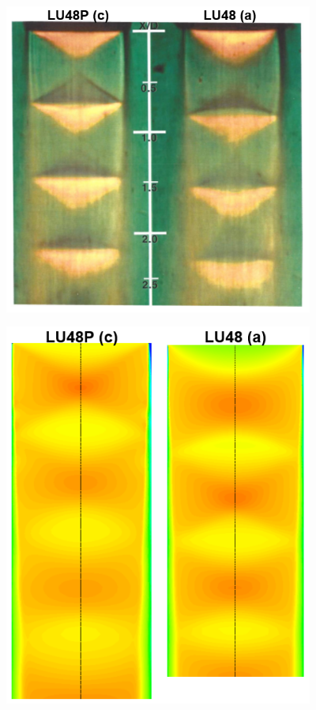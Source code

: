 \documentclass[12pt]{article} %
\begin{document}
\begin{center}
    \includegraphics[width=4in]{VenaContracta_Real.PNG}
    \label{fig:VenaContractaReal}
\end{center}

\begin{center}
    \includegraphics[width=4in]{VenaContracta_CFD.PNG}
    \label{fig:VenaContractaCFD}
\end{center}
\end{document}
